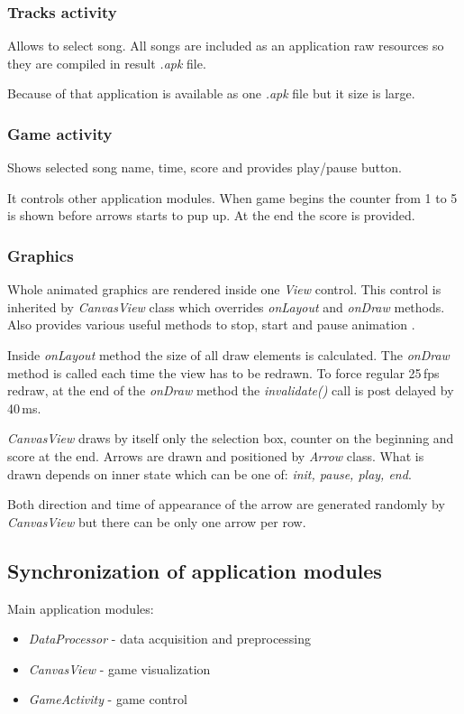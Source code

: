 \documentclass[conference]{IEEEtran}
\begin{document}
\subsubsection{Tracks activity}
Allows to select song. All songs are included as an application raw resources so they are compiled in result \emph{.apk} file.

Because of that application is available as one \emph{.apk} file but it size is large.


\subsubsection{Game activity}
Shows selected song name, time, score and provides play/pause button.

It controls other application modules.
When game begins the counter from 1 to 5 is shown before arrows starts to pup up. At the end the score is provided.

\subsubsection{Graphics}
Whole animated graphics are rendered inside one \emph{View} control.
This control is inherited by \emph{CanvasView} class which overrides \emph{onLayout} and \emph{onDraw} methods. Also provides various useful methods to stop, start and pause animation \cite{Application}.

Inside \emph{onLayout} method the size of all draw elements is calculated.
The \emph{onDraw} method is called each time the view has to be redrawn.
To force regular 25\,fps redraw, at the end of the \emph{onDraw} method the \emph{invalidate()} call is post delayed by 40\,ms.


\emph{CanvasView} draws by itself only the selection box, counter on the beginning and score at the end.
Arrows are drawn and positioned by \emph{Arrow} class.
What is drawn depends on inner state which can be one of: \emph{init, pause, play, end}.

Both direction and time of appearance of the arrow are generated randomly by \emph{CanvasView} but there can be only one arrow per row.

\subsection{Synchronization of application modules}

Main application modules:
\begin{itemize}
    \item \emph{DataProcessor} - data acquisition and preprocessing
    \item \emph{CanvasView} - game visualization
    \item \emph{GameActivity} - game control
\end{itemize}
\end{document}
